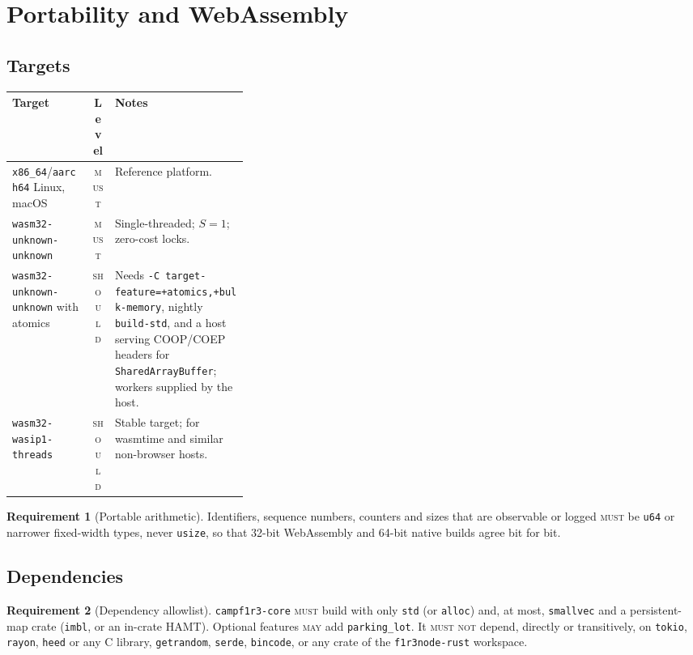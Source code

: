 \documentclass[11pt]{article}
\theoremstyle{plain}
\theoremstyle{definition}
\newtheorem{requirement}{Requirement}
\newcommand{\MUST}{\textsc{must}}
\newcommand{\MUSTNOT}{\textsc{must not}}
\newcommand{\SHOULD}{\textsc{should}}
\newcommand{\MAY}{\textsc{may}}
\newcommand{\code}[1]{\texttt{#1}}
\begin{document}
\section{Portability and WebAssembly}\label{sec:wasm}

\subsection{Targets}

\begin{center}
\begin{tabularx}{\linewidth}{@{}>{\raggedright\arraybackslash}p{0.34\linewidth}cX@{}}
\toprule
Target & Level & Notes\\
\midrule
\code{x86\_64}/\code{aarch64} Linux, macOS & \MUST & Reference platform.\\
\code{wasm32-unknown-unknown} & \MUST & Single-threaded; $S=1$; zero-cost locks.\\
\code{wasm32-unknown-unknown} with atomics & \SHOULD & Needs \code{-C target-feature=+atomics,+bulk-memory}, nightly \code{build-std}, and a host serving COOP/COEP headers for \code{SharedArrayBuffer}; workers supplied by the host.\\
\code{wasm32-wasip1-threads} & \SHOULD & Stable target; for wasmtime and similar non-browser hosts.\\
\bottomrule
\end{tabularx}
\end{center}

\begin{requirement}[Portable arithmetic]
Identifiers, sequence numbers, counters and sizes that are observable or logged
\MUST{} be \code{u64} or narrower fixed-width types, never \code{usize}, so that 32-bit
WebAssembly and 64-bit native builds agree bit for bit.
\end{requirement}

\subsection{Dependencies}\label{sec:deps}

\begin{requirement}[Dependency allowlist]
\code{campf1r3-core} \MUST{} build with only \code{std} (or \code{alloc}) and, at most,
\code{smallvec} and a persistent-map crate (\code{imbl}, or an in-crate HAMT). Optional
features \MAY{} add \code{parking\_lot}. It \MUSTNOT{} depend, directly or
transitively, on \code{tokio}, \code{rayon}, \code{heed} or any C library,
\code{getrandom}, \code{serde}, \code{bincode}, or any crate of the
\code{f1r3node-rust} workspace.
\end{requirement}
\end{document}
